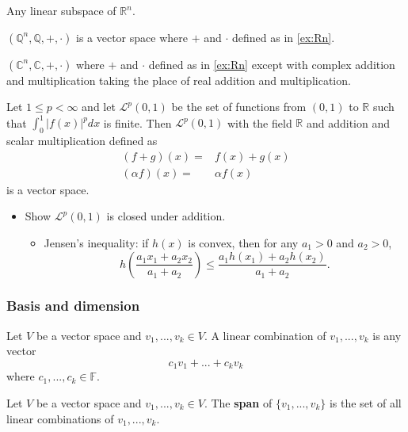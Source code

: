 \documentclass[compress]{beamer}
\def\F{\mathbb{F}}
\def\R{\mathbb{R}}
\begin{document}
\begin{frame}
  \begin{example}
    Any linear subspace of $\R^n$.
  \end{example}
  
  \begin{example}
    $(\mathbb{Q}^n, \mathbb{Q}, +, \cdot)$ is a vector space
    where $+$ and $\cdot$ defined as in \ref{ex:Rn}.
  \end{example}
  
  \begin{example}
    $(\mathbb{C}^n, \mathbb{C}, +, \cdot)$ where $+$ and $\cdot$ defined
    as in \ref{ex:Rn} except with complex addition and multiplication
    taking the place of real addition and multiplication. 
  \end{example}
\end{frame}

\begin{frame}
  \begin{example}\label{ex:L2}
    Let $1 \leq p < \infty$ and let $\mathcal{L}^p(0,1)$ be the set of
    functions from $(0,1)$ to $\R$ such that $\int_0^1 |f(x)|^p dx$ is
    finite.  Then $\mathcal{L}^p (0,1)$ with the field $\R$ and addition
    and scalar multiplication defined as
    \begin{align*}
      (f + g)(x) = & f(x) + g(x) \\
      (\alpha f)(x) = & \alpha f(x)
    \end{align*} 
    is a vector space.
  \end{example}
  \begin{itemize}
  \item Show $\mathcal{L}^p(0,1)$ is closed under addition.
    \begin{itemize}
    \item Jensen's inequality: if $h(x)$ is convex, then for any
      $a_1>0$ and $a_2>0$, 
      \[ h\left(\frac{a_1 x_1 + a_2 x_2}{a_1 + a_2} \right) \leq \frac{a_1
        h(x_1) + a_2 h(x_2) }{a_1 + a_2}. \]
    \end{itemize}
  \end{itemize}
\end{frame}

\subsubsection{Basis and dimension}

\begin{frame}
  \begin{definition}
    Let $V$ be a vector space and $v_1,..., v_k \in V$. A linear
    combination of $v_1,..., v_k$ is any vector 
    \[c_1 v_1 + ... + c_k v_k \]
    where $c_1, ..., c_k \in \F$. 
  \end{definition}
  \begin{definition}
    Let $V$ be a vector space and $v_1,..., v_k \in V$. The
    \textbf{span} of $\{ v_1, ... , v_k \}$ is the set
    of all linear combinations of $v_1, ... , v_k$.
  \end{definition}
\end{frame}
\end{document}
